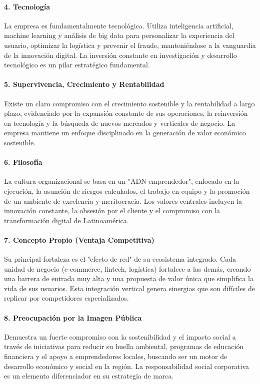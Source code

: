 \paragraph{4. Tecnología}
La empresa es fundamentalmente tecnológica. Utiliza inteligencia artificial, machine learning y análisis de big data para personalizar la experiencia del usuario, optimizar la logística y prevenir el fraude, manteniéndose a la vanguardia de la innovación digital. La inversión constante en investigación y desarrollo tecnológico es un pilar estratégico fundamental.

\paragraph{5. Supervivencia, Crecimiento y Rentabilidad}
Existe un claro compromiso con el crecimiento sostenible y la rentabilidad a largo plazo, evidenciado por la expansión constante de sus operaciones, la reinversión en tecnología y la búsqueda de nuevos mercados y verticales de negocio. La empresa mantiene un enfoque disciplinado en la generación de valor económico sostenible.

\paragraph{6. Filosofía}
La cultura organizacional se basa en un "ADN emprendedor", enfocado en la ejecución, la asunción de riesgos calculados, el trabajo en equipo y la promoción de un ambiente de excelencia y meritocracia. Los valores centrales incluyen la innovación constante, la obsesión por el cliente y el compromiso con la transformación digital de Latinoamérica.

\paragraph{7. Concepto Propio (Ventaja Competitiva)}
Su principal fortaleza es el "efecto de red" de su ecosistema integrado. Cada unidad de negocio (e-commerce, fintech, logística) fortalece a las demás, creando una barrera de entrada muy alta y una propuesta de valor única que simplifica la vida de sus usuarios. Esta integración vertical genera sinergias que son difíciles de replicar por competidores especializados.

\paragraph{8. Preocupación por la Imagen Pública}
Demuestra un fuerte compromiso con la sostenibilidad y el impacto social a través de iniciativas para reducir su huella ambiental, programas de educación financiera y el apoyo a emprendedores locales, buscando ser un motor de desarrollo económico y social en la región. La responsabilidad social corporativa es un elemento diferenciador en su estrategia de marca.

